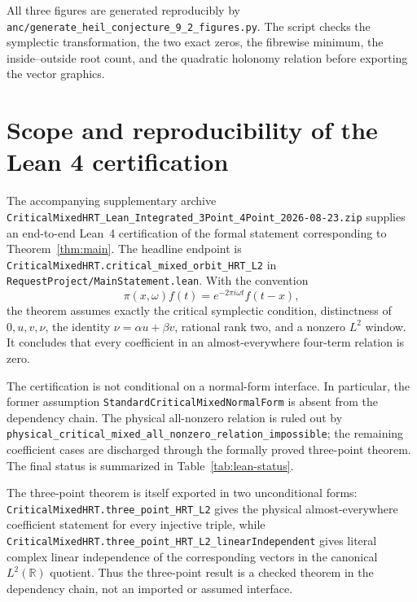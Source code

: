 \documentclass[reqno]{amsart}
\theoremstyle{remark}
\numberwithin{equation}{section}
\newcommand{\R}{\mathbb{R}}
\newcommand{\certarchive}{\nolinkurl{CriticalMixedHRT_Lean_Integrated_3Point_4Point_2026-08-23.zip}}
\begin{document}
All three figures are generated reproducibly by
\nolinkurl{anc/generate_heil_conjecture_9_2_figures.py}. The script checks
the symplectic transformation, the two exact zeros, the fibrewise minimum,
the inside--outside root count, and the quadratic holonomy relation before
exporting the vector graphics.

\clearpage
\appendix

\section{Scope and reproducibility of the Lean 4 certification}
\label{app:formalization}

The accompanying supplementary archive \certarchive{} supplies an end-to-end
Lean~4 certification of the formal statement corresponding to
Theorem~\ref{thm:main}. The headline endpoint is
\nolinkurl{CriticalMixedHRT.critical_mixed_orbit_HRT_L2} in
\nolinkurl{RequestProject/MainStatement.lean}. With the convention
\[
  \pi(x,\omega)f(t)=e^{-2\pi i\omega t}f(t-x),
\]
the theorem assumes exactly the critical symplectic condition, distinctness
of \(0,u,v,\nu\), the identity \(\nu=\alpha u+\beta v\), rational rank two,
and a nonzero \(L^2\) window. It concludes that every coefficient in an
almost-everywhere four-term relation is zero.

The certification is not conditional on a normal-form interface. In
particular, the former assumption
\nolinkurl{StandardCriticalMixedNormalForm} is absent from the dependency chain.
The physical all-nonzero relation is ruled out by
\nolinkurl{physical_critical_mixed_all_nonzero_relation_impossible}; the
remaining coefficient cases are discharged through the formally proved
three-point theorem. The final status is summarized in
Table~\ref{tab:lean-status}.

The three-point theorem is itself exported in two unconditional forms:
\nolinkurl{CriticalMixedHRT.three_point_HRT_L2} gives the physical
almost-everywhere coefficient statement for every injective triple, while
\nolinkurl{CriticalMixedHRT.three_point_HRT_L2_linearIndependent} gives literal
complex linear independence of the corresponding vectors in the canonical
\(L^2(\R)\) quotient. Thus the three-point result is a checked theorem in the
dependency chain, not an imported or assumed interface.
\end{document}
